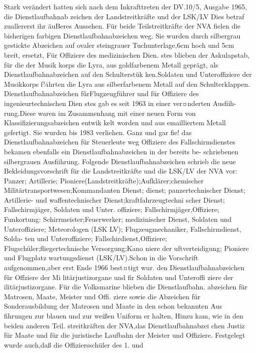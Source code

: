 Stark verändert hatten sich nach dem Inkrafttreten
der DV.10/5, Ausgabe 1965, die Dienstlaufbahnab
zeichen der Landstreitkräfte und der LSK/LV
Dies betraf zuallererst ihr äuBeres Aussehen. Für
beide Teilstreitkräfte der NVA fielen die bisherigen
farbigen Dienstlaufbahnabzeichen weg. Sie wurden
durch silbergrau gestickte Abzeichen auf ovaler
steingrauer Tuchunterlage,6cm hoch und 5cm
breit, ersetzt, Für Offiziere des medizinischen Dien.
stes blieben der Askulapstab, für die der Musik
korps die Lyra, aus goldfarbenem Metall geprägt,
als Dienstlaufbahnabzeichen auf den Schulterstük
ken.Soldaten und Unteroffiziere der Musikkorps
f¼hrten die Lyra aus silberfarbenem Metall auf den
Schulterklappen.
Dienstlaufbahnabzeichen fǔrFlugzeugführer
und für Offiziere des ingenieurtechnischen Dien
stes gab es seit 1963 in einer ver¤nderten Ausfiih-
rung.Diese waren im Zusammenhang mit einer
neuen Form von Klassifizierungsabzeichen entwik
kelt worden und aus emailliertem Metall gefertigt.
Sie wurden bis 1983 verliehen. Ganz und gar fie!
das Dienstlaufbahnabzeichen für Steuerleute weg
Offiziere des Fallschirmdienstes bekamen ebenfalls
ein Dienstlaufbahnabzeichen in der bereits be-
schriebenen silbergrauen Ausfiihrung.
Folgende Dienstlaufbahnabzeichen schrieb die
neue Bekleidungsvorschrift für die Landstreitkräfte
und die LSK/LV der NVA vor: Panzer; Artillerie;
Pioniere(Landstreitkräfte);Aufklärer;chemischer
Militärtransportwesen;Kommandanten
Dienst;
dienst; panzertechnischer Dienst; Artillerie- und
waffentechnischer Dienst;kraftfahrzeugtechni
scher Dienst; Fallschirmjäger, Soldaten und Unter.
offiziere; Fallschirmjäger,Offiziere; Funkortung:
Schirrmeister;Feuerwerker; medizinischer Dienst,
Soldaten und Unteroffiziere; Meteorologen (LSK
LV); Flugzeugmechaniker, Fallschirmdienst, Solda-
ten und Unteroffiziere; Fallschirdienst,Offiziere; Flugschüler;fliegertechnische Versorgung;Kano
niere der uftverteidigung; Pioniere und Flugplatz
wartungsdienst (LSK/LV).Schon in die Vorschrift
aufgenommen,aber erst Ende 1966 best¤tigt wur.
den Dienstlaufbahnabzeichen fǔr Offziere der Mi
litärjustizorgane und fir Soldaten und Unteroffi
ziere der ilitärjustizorgane.
Für die Volksmarine blieben die Dienstlaufbahn.
abzeichen für Matrosen, Maate, Meister und Offi.
ziere sowie die Abzeichen für Sonderausbildung der
Matrosen und Maate in den schon bekannten Aus
fihrungen zur blauen und zur weißen Uniform er
halten, Hinzu kam, wie in den beiden anderen Teil.
streitkräften der NVA,das Dienstlaufbahnabzei
chen Justiz für Maate und für die juristische
Laufbahn der Meister und Offiziere. Festgelegt
wurde auch,daß die Offiziersschüler des 1. und
